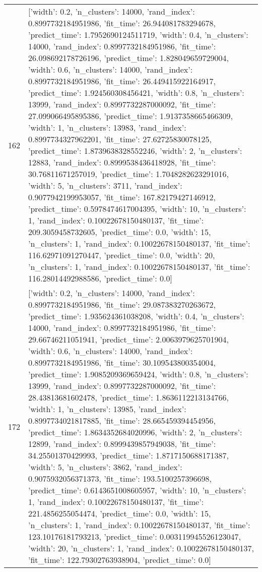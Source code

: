 \begin{tabular}{rl}
162 & [{'width': 0.2, 'n_clusters': 14000, 'rand_index': 0.8997732184951986, 'fit_time': 26.944081783294678, 'predict_time': 1.7952690124511719}, {'width': 0.4, 'n_clusters': 14000, 'rand_index': 0.8997732184951986, 'fit_time': 26.098692178726196, 'predict_time': 1.828049659729004}, {'width': 0.6, 'n_clusters': 14000, 'rand_index': 0.8997732184951986, 'fit_time': 26.449415922164917, 'predict_time': 1.924560308456421}, {'width': 0.8, 'n_clusters': 13999, 'rand_index': 0.8997732287000092, 'fit_time': 27.099066495895386, 'predict_time': 1.9137358665466309}, {'width': 1, 'n_clusters': 13983, 'rand_index': 0.8997734327962201, 'fit_time': 27.62725830078125, 'predict_time': 1.8739638328552246}, {'width': 2, 'n_clusters': 12883, 'rand_index': 0.8999538436418928, 'fit_time': 30.76811671257019, 'predict_time': 1.7048282623291016}, {'width': 5, 'n_clusters': 3711, 'rand_index': 0.9077942199953057, 'fit_time': 167.82179427146912, 'predict_time': 0.5978474617004395}, {'width': 10, 'n_clusters': 1, 'rand_index': 0.10022678150480137, 'fit_time': 209.3059458732605, 'predict_time': 0.0}, {'width': 15, 'n_clusters': 1, 'rand_index': 0.10022678150480137, 'fit_time': 116.62971091270447, 'predict_time': 0.0}, {'width': 20, 'n_clusters': 1, 'rand_index': 0.10022678150480137, 'fit_time': 116.28014492988586, 'predict_time': 0.0}] \\
172 & [{'width': 0.2, 'n_clusters': 14000, 'rand_index': 0.8997732184951986, 'fit_time': 29.087383270263672, 'predict_time': 1.935624361038208}, {'width': 0.4, 'n_clusters': 14000, 'rand_index': 0.8997732184951986, 'fit_time': 29.66746211051941, 'predict_time': 2.0063979625701904}, {'width': 0.6, 'n_clusters': 14000, 'rand_index': 0.8997732184951986, 'fit_time': 30.109543800354004, 'predict_time': 1.9085209369659424}, {'width': 0.8, 'n_clusters': 13999, 'rand_index': 0.8997732287000092, 'fit_time': 28.43813681602478, 'predict_time': 1.8636112213134766}, {'width': 1, 'n_clusters': 13985, 'rand_index': 0.8997734021817885, 'fit_time': 28.665459394454956, 'predict_time': 1.8634352684020996}, {'width': 2, 'n_clusters': 12899, 'rand_index': 0.8999439857949038, 'fit_time': 34.25501370429993, 'predict_time': 1.8717150688171387}, {'width': 5, 'n_clusters': 3862, 'rand_index': 0.9075932056371373, 'fit_time': 193.5100257396698, 'predict_time': 0.6143651008605957}, {'width': 10, 'n_clusters': 1, 'rand_index': 0.10022678150480137, 'fit_time': 221.4856255054474, 'predict_time': 0.0}, {'width': 15, 'n_clusters': 1, 'rand_index': 0.10022678150480137, 'fit_time': 123.10176181793213, 'predict_time': 0.003119945526123047}, {'width': 20, 'n_clusters': 1, 'rand_index': 0.10022678150480137, 'fit_time': 122.79302763938904, 'predict_time': 0.0}] \\

\end{tabular}
